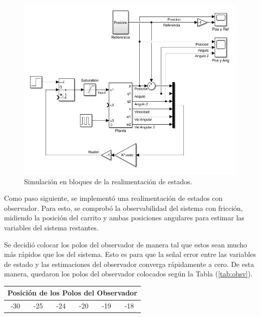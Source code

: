 \begin{figure}[H]
	\centering
	\includegraphics[width=\linewidth]{../Modelo de Control/ImagenesModelo de Control/realim.png}
	\caption{Simulación en bloques de la realimentación de estados.}	
	\label{fig:realim}
\end{figure}


Como paso siguiente, se implementó una realimentación de estados con observador. Para esto, se comprobó la observabilidad del sistema con fricción, midiendo la posición del carrito y ambas posiciones angulares para estimar las variables del sistema restantes.

Se decidió colocar los polos del observador de manera tal que estos sean mucho más rápidos que los del sistema. Esto es para que la señal error entre las variables de estado y las estimaciones del observador converga rápidamente a cero. De esta manera, quedaron los polos del observador colocados según la Tabla (\ref{tab:obsv}).

\begin{table}[H]
\centering
\begin{tabular}{@{}cccccc@{}}
\toprule
\multicolumn{6}{c}{Posición de los Polos del Observador} \\ \midrule
-30    & -25    & -24    & -20    & -19    & -18   \\ \bottomrule
\end{tabular}
\end{table}
\label{tab:obsv}

